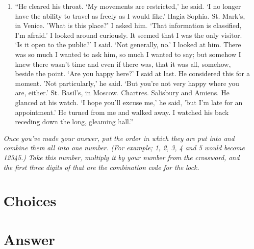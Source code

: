 \documentclass[11pt]{article}
\begin{document}
\begin{minipage}{\textwidth}
\begin{enumerate}[resume=main]
  \item “He cleared his throat. `My movements are restricted,' he said. `I no longer have the ability to travel as freely as I would like.' Hagia Sophia. St. Mark's, in Venice. 'What is this place?' I asked him. `That information is classified, I'm afraid.' I looked around curiously. It seemed that I was the only visitor. `Is it open to the public?' I said. `Not generally, no.' I looked at him. There was so much I wanted to ask him, so much I wanted to say; but somehow I knew there wasn't time and even if there was, that it was all, somehow, beside the point. `Are you happy here?' I said at last. He considered this for a moment. 'Not particularly,' he said. `But you're not very happy where you are, either.' St. Basil's, in Moscow. Chartres. Salisbury and Amiens. He glanced at his watch. `I hope you'll excuse me,' he said, 'but I'm late for an appointment.' He turned from me and walked away. I watched his back receding down the long, gleaming hall.” 
\end{enumerate}
\end{minipage}

\newpage

\textit{Once you've made your answer, put the order in which they are put into and combine them all into one number. (For example; 1, 2, 3, 4 and 5 would become 12345.) Take this number, multiply it by your number from the crossword, and the first three digits of that are the combination code for the lock.}

\section{Choices}

\newpage

\section*{Answer}
\end{document}
